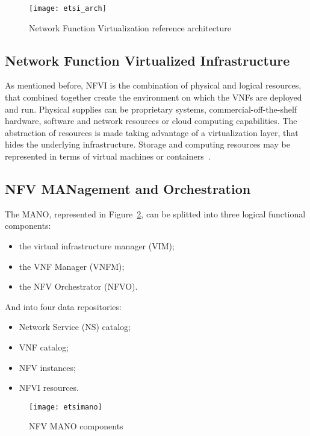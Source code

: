 \begin{figure}
  \centering
  \texttt{[image: etsi\_arch]}
  \caption{Network Function Virtualization reference
  architecture~\cite{etsi2013gs}}
  \label{chap:background:img:etsi_arch}
\end{figure}

\subsection{Network Function Virtualized Infrastructure}
As mentioned before, NFVI is the combination of physical and logical resources,
that combined together create the environment on which the VNFs are deployed
and run. Physical supplies can be proprietary systems, commercial-off-the-shelf
hardware, software and network resources or cloud computing capabilities. The
abstraction of resources is made taking advantage of a virtualization layer,
that hides the underlying infrastructure. Storage and computing resources may
be represented in terms of virtual machines or
containers~\cite{mijumbi2016network}.

\subsection{NFV MANagement and Orchestration}
The MANO, represented in Figure~\ref{chap:background:img:etsimano}, can be
splitted into three logical functional components:
\begin{itemize}
  \item the virtual infrastructure manager (VIM);
  \item the VNF Manager (VNFM);
  \item the NFV Orchestrator (NFVO).
\end{itemize}
And into four data repositories:
\begin{itemize}
  \item Network Service (NS) catalog;
  \item VNF catalog;
  \item NFV instances;
  \item NFVI resources.
\end{itemize}

\begin{figure}
  \centering
  \texttt{[image: etsimano]}
  \caption{NFV MANO components}
  \label{chap:background:img:etsimano}
\end{figure}


